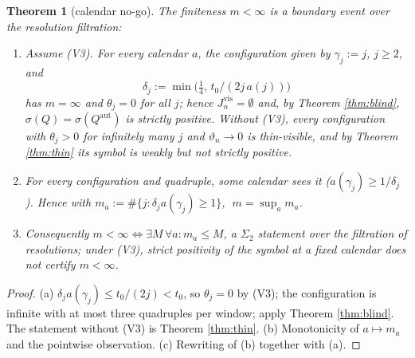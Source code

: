 \documentclass[11pt,reqno]{amsart}
\newtheorem{theorem}{Theorem}[section]
\theoremstyle{definition}
\newcommand{\Qaut}{Q^{\mathrm{aut}}}
\begin{document}
\begin{theorem}[calendar no-go]\label{thm:nogo}
The finiteness \(m<\infty\) is a boundary event over the resolution filtration:
\begin{enumerate}
\item[\textup{(a)}] Assume \textup{(V3)}. For every calendar \(a\), the
configuration given by \(\gamma_j:=j\), \(j\geq2\), and
\[
\delta_j:=\min\bigl(\tfrac14,\,t_0/(2j\,a(j))\bigr)
\]
has \(m=\infty\) and
\(\theta_j=0\) for all \(j\); hence \(J_n^{\mathrm{vis}}=\emptyset\) and, by
Theorem \ref{thm:blind}, \(\sigma(Q)=\sigma(\Qaut)\) is strictly positive.
Without \textup{(V3)}, every configuration with \(\theta_j>0\) for infinitely
many \(j\) and \(\vartheta_n\to0\) is thin-visible, and by Theorem
\ref{thm:thin} its symbol is weakly but not strictly positive.
\item[\textup{(b)}] For every configuration and quadruple, some calendar sees it
(\(a(\gamma_j)\geq1/\delta_j\)). Hence with
\(m_a:=\#\{j:\delta_j a(\gamma_j)\geq1\}\), \(\;m=\sup_a m_a\).
\item[\textup{(c)}] Consequently \(m<\infty\iff\exists M\,\forall a:m_a\leq M\),
a \(\Sigma_2\) statement over the filtration of resolutions; under
\textup{(V3)}, strict positivity of the symbol at a fixed calendar does not
certify \(m<\infty\).
\end{enumerate}
\end{theorem}

\begin{proof}
(a) \(\delta_j a(\gamma_j)\leq t_0/(2j)<t_0\), so \(\theta_j=0\) by (V3); the
configuration is infinite with at most three quadruples per window; apply Theorem
\ref{thm:blind}. The statement without (V3) is Theorem \ref{thm:thin}. (b)
Monotonicity of \(a\mapsto m_a\) and the pointwise observation. (c) Rewriting of
(b) together with (a).
\end{proof}
\end{document}
